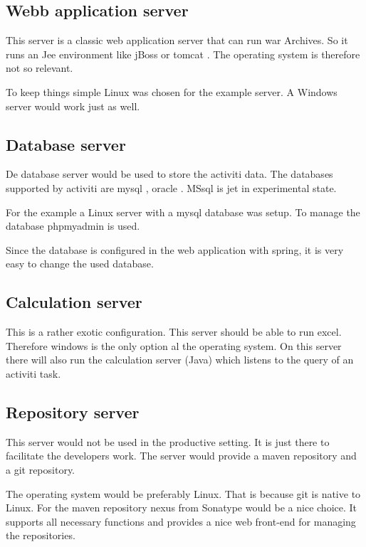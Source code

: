 \documentclass[paper=a4,twoside=false,BCOR=0mm,DIV=calc,fontsize=12pt]{scrartcl}
\begin{document}
\subsection{Webb application server}
This server is a classic web application server that can run war Archives. 
So it runs an Jee environment like jBoss \cite{jboss} or tomcat \cite{tomcat}.
The operating system is therefore not so relevant. 

To keep things simple Linux was chosen for the example server. A Windows server would work just as well.



\subsection{Database server}
De database server would be used to store the activiti data. The databases supported by activiti are mysql \cite{mysql}, oracle \cite{oracledb}. MSsql \cite{mssql} is jet in experimental state.
 
For the example a Linux server with a mysql database was setup.
To manage the database phpmyadmin \cite{phpmyadmin} is used.

Since the database is configured in the web application with spring, it is very easy to change the used database.


\subsection{Calculation server}
This is a rather exotic configuration. This server should be able to run excel. Therefore windows is the only option al the operating system. On this server there will also run the calculation server (Java) which listens to the query of an activiti task.



\subsection{Repository server}
This server would not be used in the productive setting. It is just there to facilitate the developers work.
The server would provide a maven repository and a git repository. 

The operating system would be preferably Linux. That is because git is native to Linux.
For the maven repository nexus from Sonatype would be a nice choice. It supports all necessary functions and provides a nice web front-end for managing the repositories.
\end{document}
